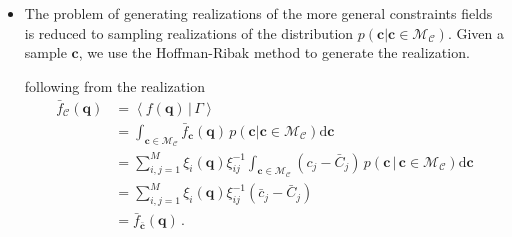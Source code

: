 \documentclass[a4paper, 11pt]{article}
\begin{document}
\begin{itemize}
\item
The problem of generating realizations of the more general constraints fields is reduced to sampling realizations of the distribution $p(\bm{c}|\bm{c}\in \mathcal{M}_\mathcal{C})$. Given a sample $\bm{c}$, we use the Hoffman-Ribak method to generate the realization.


following from the realization  
\begin{align}
\bar{f}_{\mathcal{C}}(\bm{q}) 
&=\left\langle f(\bm{q})\,|\,\Gamma\right \rangle \nonumber\\
&= \int_{\bm{c} \in \mathcal{M}_{\mathcal{C}}} \bar{f}_{\bm{c}}(\bm{q})\, p(\bm{c}|\bm{c}\in \mathcal{M}_{\mathcal{C}}) \mathrm{d}\bm{c}\nonumber\\
&= \sum_{i,j=1}^M\xi_i(\bm{q}) \xi_{ij}^{-1}\int_{\bm{c} \in \mathcal{M}_{\mathcal{C}}}  (c_j-\bar{C}_j)\, p(\bm{c}\,|\,\bm{c}\in \mathcal{M}_{\mathcal{C}}) \mathrm{d}\bm{c}\nonumber\\
&= \sum_{i,j=1}^M \xi_i(\bm{q}) \xi_{ij}^{-1} (\bar{c}_j-\bar{C}_j)\nonumber\\
&= \bar{f}_{\bar{\bm{c}}}(\bm{q})\,.
\end{align}

\end{itemize}
\end{document}
